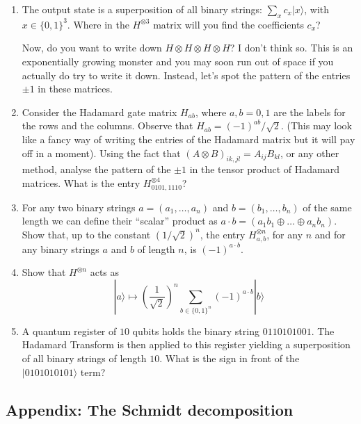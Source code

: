 \documentclass[fleqn]{article}
\begin{document}
\begin{enumerate}
\def\labelenumi{\arabic{enumi}.}
\setcounter{enumi}{2}
\item
  The output state is a superposition of all binary strings: \(\sum_x c_x|x\rangle\), with \(x\in\{0,1\}^3\).
  Where in the \(H^{\otimes 3}\) matrix will you find the coefficients \(c_x\)?

  Now, do you want to write down \(H\otimes H\otimes H\otimes H\)?
  I don't think so.
  This is an exponentially growing monster and you may soon run out of space if you actually do try to write it down.
  Instead, let's spot the pattern of the entries \(\pm1\) in these matrices.
\item
  Consider the Hadamard gate matrix \(H_{ab}\), where \(a,b=0,1\) are the labels for the rows and the columns.
  Observe that \(H_{ab}=(-1)^{ab}/\sqrt{2}\).
  (This may look like a fancy way of writing the entries of the Hadamard matrix but it will pay off in a moment).
  Using the fact that \((A\otimes B)_{ik,jl} = A_{ij}B_{kl}\), or any other method, analyse the pattern of the \(\pm1\) in the tensor product of Hadamard matrices.
  What is the entry \(H^{\otimes 4}_{0101,1110}\)?
\item
  For any two binary strings \(a=(a_1,\ldots, a_n)\) and \(b =(b_1,\ldots , b_n)\) of the same length we can define their ``scalar'' product as \(a\cdot b = (a_1b_1\oplus \ldots \oplus a_n b_n)\).
  Show that, up to the constant \((1/\sqrt{2})^n\), the entry \(H^{\otimes n}_{a,b}\), for any \(n\) and for any binary strings \(a\) and \(b\) of length \(n\), is \((-1)^{a\cdot b}\).
\item
  Show that \(H^{\otimes n}\) acts as
  \[
     |a\rangle
     \longmapsto
     \left(\frac{1}{\sqrt 2}\right)^n
     \sum_{b\in\{0,1\}^n} (-1)^{a\cdot b}|b\rangle
   \]
\item
  A quantum register of \(10\) qubits holds the binary string \(0110101001\).
  The Hadamard Transform is then applied to this register yielding a superposition of all binary strings of length \(10\).
  What is the sign in front of the \(|0101010101\rangle\) term?
\end{enumerate}

\hypertarget{appendix-the-schmidt-decomposition}{%
\subsection{Appendix: The Schmidt decomposition}\label{appendix-the-schmidt-decomposition}}
\end{document}
